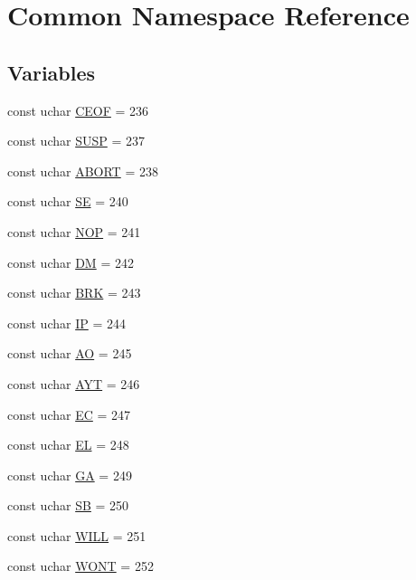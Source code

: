 \hypertarget{namespaceCommon}{
\section{Common Namespace Reference}
\label{namespaceCommon}
}
\subsection*{Variables}
\begin{DoxyCompactItemize}
\item 
const uchar \hyperlink{namespaceCommon_ac3b3977f247eb02cba4a958c4248954c}{CEOF} = 236
\item 
const uchar \hyperlink{namespaceCommon_a298ad65506db60a8fc1f7ffe0e2287e8}{SUSP} = 237
\item 
const uchar \hyperlink{namespaceCommon_a3baeb5145a70bc3464d679dbf911b3fe}{ABORT} = 238
\item 
const uchar \hyperlink{namespaceCommon_a0c4113e7abc4d20f03b776ea5dad7708}{SE} = 240
\item 
const uchar \hyperlink{namespaceCommon_a0e59839d3c83c0730d083866e0660b43}{NOP} = 241
\item 
const uchar \hyperlink{namespaceCommon_adc4c0767413b15f49984f376b55e70f9}{DM} = 242
\item 
const uchar \hyperlink{namespaceCommon_af6a16e62eae375dadc9f539d9593d02c}{BRK} = 243
\item 
const uchar \hyperlink{namespaceCommon_a9dc7df4b9c8153a6dfc4697082ccd0af}{IP} = 244
\item 
const uchar \hyperlink{namespaceCommon_a62f2f5457505cae888d9a4ea2f71f3b5}{AO} = 245
\item 
const uchar \hyperlink{namespaceCommon_a1975b22cd4d2c46ff86ef9df52b79c3b}{AYT} = 246
\item 
const uchar \hyperlink{namespaceCommon_a52db9637074843c1cfeac037f0156946}{EC} = 247
\item 
const uchar \hyperlink{namespaceCommon_a483d993e9812ba125e32c9b6ea74d4bd}{EL} = 248
\item 
const uchar \hyperlink{namespaceCommon_a55fe9a0bad3ae7274636fe93ebb89188}{GA} = 249
\item 
const uchar \hyperlink{namespaceCommon_a8f9329beba94b73b67546aa68de2b999}{SB} = 250
\item 
const uchar \hyperlink{namespaceCommon_afdc22f290799b81e461303620c36a738}{WILL} = 251
\item 
const uchar \hyperlink{namespaceCommon_a32e6c59e2d488ff321bde5b69b2684f1}{WONT} = 252

\end{DoxyCompactItemize}
